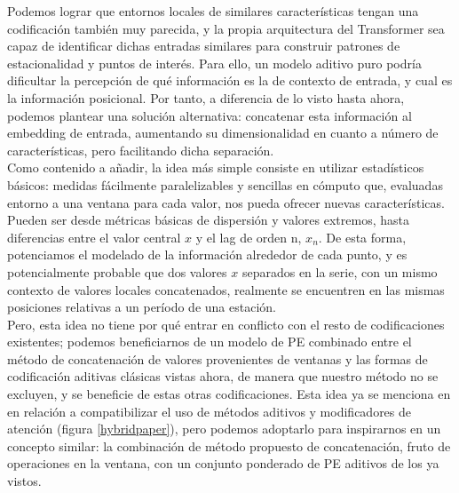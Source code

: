 Podemos lograr que entornos locales de similares características tengan una codificación también muy parecida, y la propia arquitectura del Transformer sea capaz de identificar dichas entradas similares para construir patrones de estacionalidad y puntos de interés. Para ello, un modelo aditivo puro podría dificultar la percepción de qué información es la de contexto de entrada, y cual es la información posicional. Por tanto, a diferencia de lo visto hasta ahora, podemos plantear una solución alternativa: concatenar esta información al embedding de entrada, aumentando su dimensionalidad en cuanto a número de características, pero facilitando dicha separación.\\

Como contenido a añadir, la idea más simple consiste en utilizar estadísticos básicos: medidas fácilmente paralelizables y sencillas en cómputo que, evaluadas entorno a una ventana para cada valor, nos pueda ofrecer nuevas características. Pueden ser desde métricas básicas de dispersión y valores extremos, hasta diferencias entre el valor central $x$ y el lag de orden n, $x_n$. De esta forma, potenciamos el modelado de la información alrededor de cada punto, y es potencialmente probable que dos valores $x$ separados en la serie, con un mismo contexto de valores locales concatenados, realmente se encuentren en las mismas posiciones relativas a un período de una estación.\\

Pero, esta idea no tiene por qué entrar en conflicto con el resto de codificaciones existentes; podemos beneficiarnos de un modelo de PE combinado entre el método de concatenación de valores provenientes de ventanas y las formas de codificación aditivas clásicas vistas ahora, de manera que nuestro método no se excluyen, y se beneficie de estas otras codificaciones. Esta idea ya se menciona en \cite{irani2025positionalencodingtransformerbasedtime} en relación a compatibilizar el uso de métodos aditivos y modificadores de atención (figura \ref{hybridpaper}), pero podemos adoptarlo para inspirarnos en un concepto similar: la combinación de método propuesto de concatenación, fruto de operaciones en la ventana, con un conjunto ponderado de PE aditivos de los ya vistos.\\

